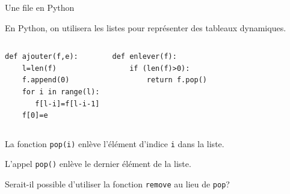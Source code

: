 \documentclass[10pt]{beamer}
\begin{document}
\begin{frame}[fragile]
{Une file en Python}

En Python, on utilisera les listes pour représenter des tableaux dynamiques. 

\begin{exampleblock}{}
\begin{columns}
\column{5 cm}
\begin{verbatim}
def ajouter(f,e):
    l=len(f)
    f.append(0)
    for i in range(l):
   	   f[l-i]=f[l-i-1]
    f[0]=e
\end{verbatim}

\pause

\column{5 cm}
\vspace{-1.5 cm}
\begin{verbatim}
def enlever(f):
    if (len(f)>0):
        return f.pop()
\end{verbatim}
\end{columns}
\end{exampleblock}


\pause

\vspace{0.5 cm}


\vspace{0.2 cm}

La fonction \texttt{pop(i)} enlève l'élément d'indice \texttt{i} dans la liste. \\

\vspace{0.2 cm}

L'appel \texttt{pop()} enlève le dernier élément de la liste. 

\vspace{0.2 cm}
Serait-il possible d'utiliser la fonction \texttt{remove} au lieu de \texttt{pop}?  \\


\end{frame}
\end{document}
